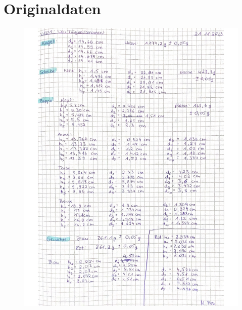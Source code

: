 \section{Originaldaten}
\label{sec:Originaldaten}
\begin{figure}[H]
    \includegraphics[width=\textwidth]{Messwerte_1.pdf}
    \label{fig:Messungen_1}
\end{figure}
